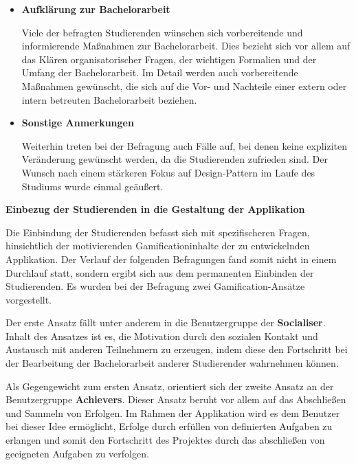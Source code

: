 \documentclass{scrreprt}
\begin{document}
\begin{itemize}
\begin{itemize}
\item \textbf{Aufklärung zur Bachelorarbeit}
\par Viele der befragten Studierenden wünschen sich vorbereitende und informierende Maßnahmen zur Bachelorarbeit. Dies bezieht sich vor allem auf das Klären organisatorischer Fragen, der wichtigen Formalien und der Umfang der Bachelorarbeit. Im Detail werden auch vorbereitende Maßnahmen gewünscht, die sich auf die Vor- und Nachteile einer extern oder intern betreuten Bachelorarbeit beziehen.

\item \textbf{Sonstige Anmerkungen}
\par Weiterhin treten bei der Befragung auch Fälle auf, bei denen keine expliziten Veränderung gewünscht werden, da die Studierenden zufrieden sind. Der Wunsch nach einem stärkeren Fokus auf Design-Pattern im Laufe des Studiums wurde einmal geäußert.

\end{itemize}

\end{itemize}

\newpage
\par \textbf{Einbezug der Studierenden in die Gestaltung der Applikation}\\
\par Die Einbindung der Studierenden befasst sich mit spezifischeren Fragen, hinsichtlich der motivierenden Gamificationinhalte der zu entwickelnden Applikation. Der Verlauf der folgenden Befragungen fand somit nicht in einem Durchlauf statt, sondern ergibt sich aus dem permanenten Einbinden der Studierenden. Es wurden bei der Befragung zwei Gamification-Ansätze vorgestellt.\\
\par Der erste Ansatz fällt unter anderem in die Benutzergruppe der \textbf{Socialiser}. Inhalt des Ansatzes ist es, die Motivation durch den sozialen Kontakt und Austausch mit anderen Teilnehmern zu erzeugen, indem diese den Fortschritt bei der Bearbeitung der Bachelorarbeit anderer Studierender wahrnehmen können.\\
\par Als Gegengewicht zum ersten Ansatz, orientiert sich der zweite Ansatz an der Benutzergruppe \textbf{Achievers}. Dieser Ansatz beruht vor allem auf das Abschließen und Sammeln von Erfolgen. Im Rahmen der Applikation wird es dem Benutzer bei dieser Idee ermöglicht, Erfolge durch erfüllen von definierten Aufgaben zu erlangen und somit den Fortschritt des Projektes durch das abschließen von geeigneten Aufgaben zu verfolgen.\\
\end{document}

